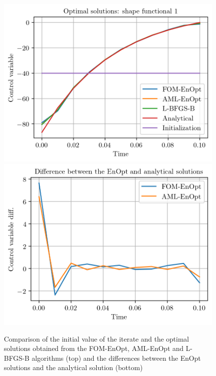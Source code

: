 \begin{figure}
\centering
\includegraphics{Plots/solutions.png}
\includegraphics{Plots/solutionsDiffer.png}
\caption{\label{FOMAMLEnOptSolutionComp}Comparison of the initial value of the iterate and the optimal solutions obtained from the FOM-EnOpt, AML-EnOpt and L-BFGS-B algorithms (top) and the differences between the EnOpt solutions and the analytical solution (bottom)}
\end{figure}

